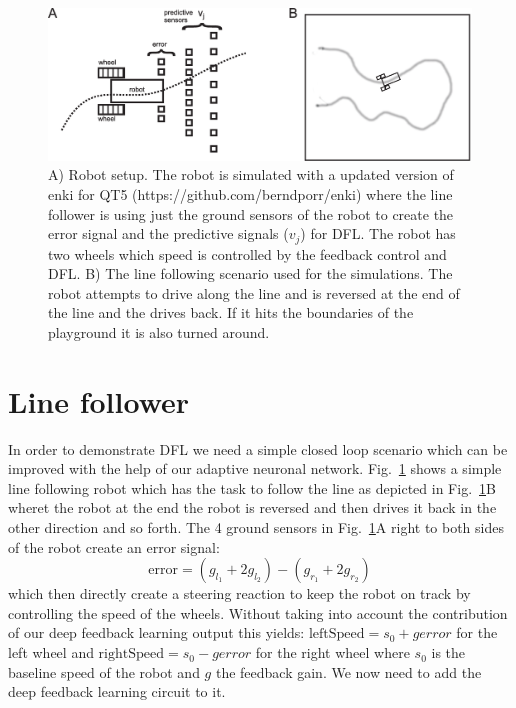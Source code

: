 \documentclass{llncs}
\begin{document}
\begin{figure}[h!]
  \centering
  \includegraphics[width=\columnwidth]{linefollower_robot_playground}
  \caption{A) Robot setup. The robot is simulated with a updated
    version of enki for QT5 (https://github.com/berndporr/enki)
    where the line follower is using just the ground sensors of the
    robot to create the error signal and the predictive signals ($v_j$)
    for DFL. The robot has two wheels which speed is controlled
    by the feedback control and DFL.
    B) The line following scenario used for the simulations. The robot
    attempts to drive along the line and is reversed at the end of the
    line and the drives back. If it hits the boundaries of the playground
    it is also turned around.
    \label{linefollower_robot_playground}}
\end{figure}




\section{Line follower}
In order to demonstrate DFL we need a simple closed loop scenario which can be
improved with the help of our adaptive neuronal network. 
Fig.~\ref{linefollower_robot_playground} shows a simple line following robot which has the task to
follow the line as depicted in
Fig.~\ref{linefollower_robot_playground}B wheret the robot at the end the robot is reversed
and then drives it back in the other direction and so forth. The 4 ground sensors
in Fig.~\ref{linefollower_robot_playground}A right to both sides of the robot create
an error signal:
\begin{equation}
\mathrm{error} = (g_{l_1}+2 g_{l_2})-(g_{r_1}+2 g_{r_2})
\end{equation}
which then directly create a steering reaction to keep the robot on track by
controlling the speed of the wheels. Without taking into account the contribution
of our deep feedback learning output this yields: $\mathrm{leftSpeed} = s_0 + g error$ for the
left wheel and $\mathrm{rightSpeed} = s_0 - g error$ for the right wheel
where $s_0$ is the baseline speed of the robot and $g$ the feedback gain. We now
need to add the deep feedback learning circuit to it.
\end{document}
